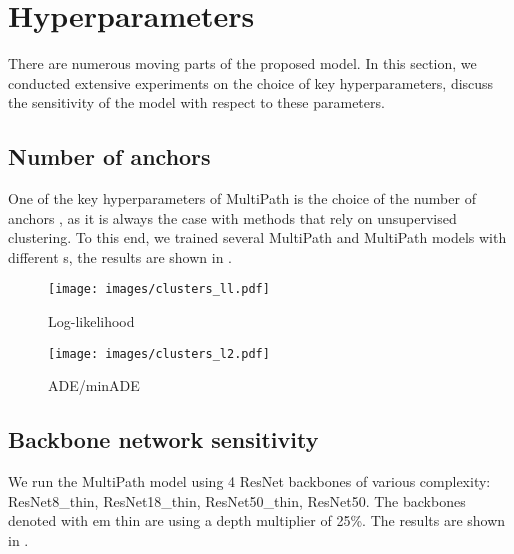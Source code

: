 \documentclass{article}
\newcommand{\multiflow}{MultiPath\xspace}
\begin{document}
\section{Hyperparameters}
\label{sec:hyperparameters}

There are numerous moving parts of the proposed model. In this section, we conducted extensive experiments on the choice of key hyperparameters, discuss the sensitivity of the model with respect to these parameters.


\subsection{Number of anchors }
\label{sec:anchors}

One of the key hyperparameters of \multiflow is the choice of the number of anchors , as it is always the case with methods that rely on unsupervised clustering. To this end, we trained several \multiflow  and \multiflow  models with different s, the results are shown in .

\begin{figure*}[!htbp]
\centering
  \begin{subfigure}[b]{0.35\textwidth}
    \texttt{[image: images/clusters\_ll.pdf]}
    \caption{Log-likelihood}
    \label{fig:clusters_ll}
  \end{subfigure}
  \begin{subfigure}[b]{0.35\textwidth}
    \texttt{[image: images/clusters\_l2.pdf]}
    \caption{ADE/minADE}
    \label{fig:clusters_l2}
  \end{subfigure}
\caption{Results as function of the number of clusters . (a): \multiflow  on the log-likelihood metric with  ranging from 1 to 64. (b): \multiflow  on the ADE and minADE metrics, with  ranging from 1 to 128.
}
\label{fig:clusters}
\end{figure*}


\subsection{Backbone network sensitivity}
\label{sec:backbone}

We run the \multiflow  model using 4 ResNet \cite{He16} backbones of various complexity: ResNet8\_thin, ResNet18\_thin, ResNet50\_thin, ResNet50. The backbones denoted with {em thin} are using a depth multiplier of 25\%. The results are shown in .
\end{document}
